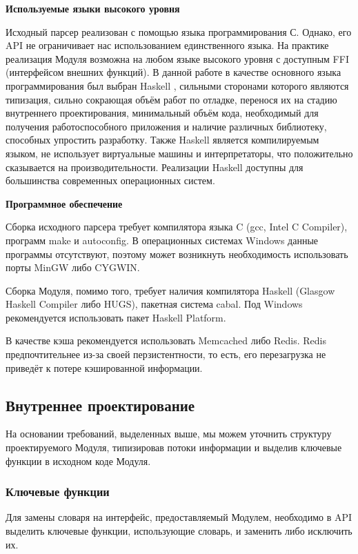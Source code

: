 \textbf{Используемые языки высокого уровня}

Исходный парсер реализован с помощью языка программирования С. Однако, его API не ограничивает нас использованием единственного языка. На практике реализация Модуля возможна на любом языке высокого уровня с доступным FFI (интерфейсом внешних функций). В данной работе в качестве основного языка программирования был выбран Haskell \cite{haskell}, сильными сторонами которого являются типизация, сильно сокрающая объём работ по отладке, перенося их на стадию внутреннего проектирования, минимальный объём кода, необходимый для получения работоспособного приложения и наличие различных библиотеку, способных упростить разработку. Также Haskell является компилируемым языком, не использует виртуальные машины и интерпретаторы, что положительно сказывается на производительности. Реализации Haskell доступны для большинства современных операционных систем.

\textbf{Программное обеспечение}

Сборка исходного парсера требует компилятора языка C (gcc, Intel C Compiler), программ make и autoconfig. В операционных системах Windows данные программы отсутствуют, поэтому может возникнуть необходимость использовать порты MinGW либо CYGWIN.

Сборка Модуля, помимо того, требует наличия компилятора Haskell (Glasgow Haskell Compiler либо HUGS), пакетная система cabal. Под Windows рекомендуется использовать пакет Haskell Platform.

В качестве кэша рекомендуется использовать Memcached либо Redis. Redis предпочтительнее из-за своей перзистентности, то есть, его перезагрузка не приведёт к потере кэшированной информации.

\subsection{Внутреннее проектирование}

На основании требований, выделенных выше, мы можем уточнить структуру проектируемого Модуля, типизировав потоки информации и выделив ключевые функции в исходном коде Модуля.

\subsubsection{Ключевые функции}

Для замены словаря на интерфейс, предоставляемый Модулем, необходимо в API выделить ключевые функции, использующие словарь, и заменить либо исключить их.

